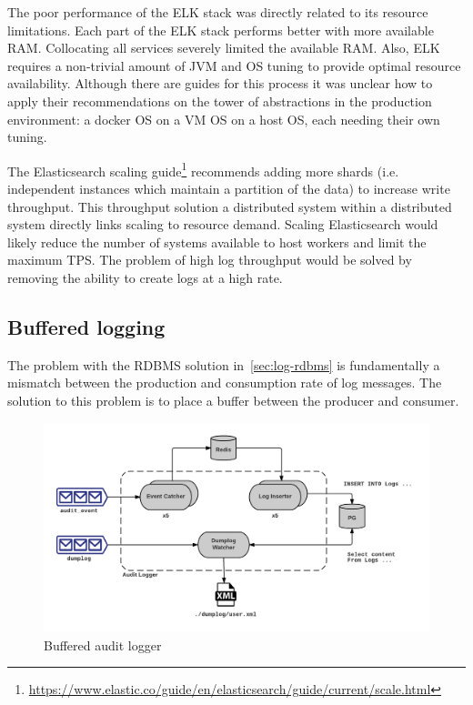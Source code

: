 The poor performance of the ELK stack was directly related to its resource limitations.
Each part of the ELK stack performs better with more available RAM.
Collocating all services severely limited the available RAM.
Also, ELK requires a non-trivial amount of JVM and OS tuning to provide optimal resource availability.
Although there are guides for this process it was unclear how to apply their recommendations on the tower of abstractions in the production environment: a docker OS on a VM OS on a host OS, each needing their own tuning.

The Elasticsearch scaling guide\footnote{\url{https://www.elastic.co/guide/en/elasticsearch/guide/current/scale.html}} recommends adding more shards (i.e. independent instances which maintain a partition of the data) to increase write throughput.
This throughput solution \textemdash{} a distributed system within a distributed system \textemdash{} directly links scaling to resource demand.
Scaling Elasticsearch would likely reduce the number of systems available to host workers and limit the maximum TPS.
The problem of high log throughput would be solved by removing the ability to create logs at a high rate.

\subsection{Buffered logging}\label{sec:log-buf}
The problem with the RDBMS solution in~\ref{sec:log-rdbms} is fundamentally a mismatch between the production and consumption rate of log messages.
The solution to this problem is to place a buffer between the producer and consumer.

\begin{figure}[tbph]
  \centering
  \includegraphics[width=0.95\linewidth]{graphics/audit}
  \caption{Buffered audit logger}
  \label{fig:audit}
\end{figure}

